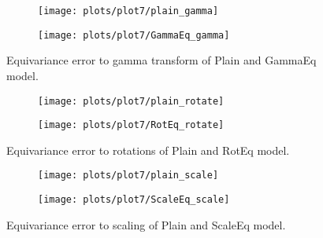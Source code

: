    \begin{figure}[h!]
    \begin{adjustwidth}{-11em}{-11em}
        \centering
        \begin{subfigure}{0.5\textwidth}
            \texttt{[image: plots/plot7/plain\_gamma]}
        \end{subfigure}
        \begin{subfigure}{0.5\textwidth}
            \texttt{[image: plots/plot7/GammaEq\_gamma]}
        \end{subfigure}
    \end{adjustwidth}
        \caption{Equivariance error to gamma transform of Plain and GammaEq
        model.}
        \label{fig:plot7gamma}
    \end{figure}

    \begin{figure}[h!]
    \begin{adjustwidth}{-11em}{-11em}
        \centering
        \begin{subfigure}{0.55\textwidth}
            \texttt{[image: plots/plot7/plain\_rotate]}
        \end{subfigure}
        \begin{subfigure}{0.55\textwidth}
            \texttt{[image: plots/plot7/RotEq\_rotate]}
        \end{subfigure}
    \end{adjustwidth}
        \caption{Equivariance error to rotations of Plain and RotEq
        model.}
        \label{fig:plot7rot}
    \end{figure}


    \begin{figure}[h!]
    \begin{adjustwidth}{-11em}{-11em}
        \centering
        \begin{subfigure}{0.5\textwidth}
            \texttt{[image: plots/plot7/plain\_scale]}
        \end{subfigure}
        \begin{subfigure}{0.5\textwidth}
            \texttt{[image: plots/plot7/ScaleEq\_scale]}
        \end{subfigure}
    \end{adjustwidth}
        \caption{Equivariance error to scaling of Plain and ScaleEq
        model.}
        \label{fig:plot7scale}
    \end{figure}


